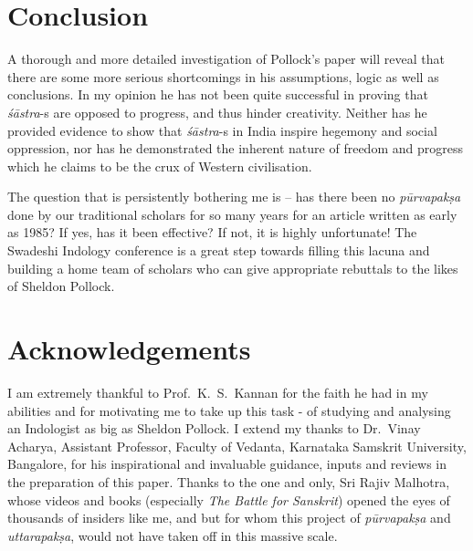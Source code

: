 \section*{Conclusion}

A thorough and more detailed investigation of Pollock's paper will reveal that there are some more serious shortcomings in his assumptions, logic as well as conclusions. In my opinion he has not been quite successful in proving that {\sl śāstra}-s are opposed to progress, and thus hinder creativity. Neither has he provided evidence to show that {\sl śāstra}-s in India inspire hegemony and social oppression, nor has he demonstrated the inherent nature of freedom and progress which he claims to be the crux of Western civilisation.

The question that is persistently bothering me is -- has there been no {\sl pūrvapakṣa} done by our traditional scholars for so many years for an article written as early as 1985? If yes, has it been effective? If not, it is highly unfortunate! The Swadeshi Indology conference is a great step towards filling this lacuna and building a home team of scholars who can give appropriate rebuttals to the likes of Sheldon Pollock.

\section*{Acknowledgements}

I am extremely thankful to Prof.~K.~S.~Kannan for the faith he had in my abilities and for motivating me to take up this task - of studying and analysing an Indologist as big as Sheldon Pollock. I extend my thanks to Dr.~Vinay Acharya, Assistant Professor, Faculty of Vedanta, Karnataka Samskrit University, Bangalore, for his inspirational and invaluable guidance, inputs and reviews in the preparation of this paper. Thanks to the one and only, Sri Rajiv Malhotra, whose videos and books (especially {\sl The Battle for Sanskrit}) opened the eyes of thousands of insiders like me, and but for whom this project of {\sl pūrvapakṣa} and {\sl uttarapakṣa}, would not have taken off in this massive scale.

